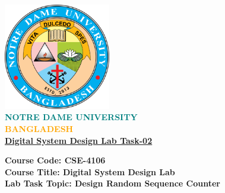 \documentclass[12pt]{article}
\begin{document}
\begin{titlepage}					%
\begin{center}
    \includegraphics[width=0.35\textwidth]{logo.png} \\
    \vspace{0.5cm}
    \textbf{\Huge \textcolor{teal}{NOTRE DAME} \textcolor{teal}{UNIVERSITY}} \\
    \vspace{0.5cm}
    \textbf{\Huge \textcolor{orange}{BANGLADESH}} \\
    
    \vspace{0.9cm}
    \textbf{\Huge \underline{Digital System Design Lab Task-02}} \\
    
    \vspace{1.5em}
    \begin{flushleft}
    	\textbf{\Large Course Code: CSE-4106} \\
		\vspace{0.3cm}        
        \textbf{\Large Course Title: Digital System Design Lab} \\
        \vspace{0.3cm}
        \textbf{\Large Lab Task Topic: Design Random Sequence Counter } \\        
    \end{flushleft}
    

\end{center}
\end{titlepage}
\end{document}
